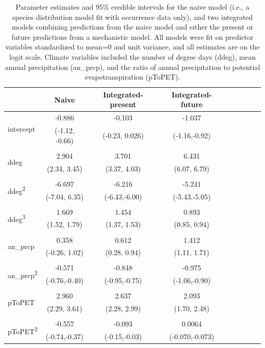\documentclass[11pt]{article}
\newcommand{\rev}[1]{{\color{RoyalBlue}#1}}
\begin{document}
\begin{table}[t]
	\footnotesize
	\caption{\rev{Parameter estimates and 95\% credible intervals for the naive model (i.e., a species distribution model fit with occurrence data only), and two integrated models combining predictions from the naive model and either the present or future predictions from a mechanistic model. All models were fit on predictor variables standardized to mean=0 and unit variance, and all estimates are on the logit scale. Climate variables included the number of degree days (ddeg), mean annual precipitation (an\_prcp), and the ratio of annual precipitation to potential evapotranspiration (pToPET).}}
	\begin{tabular}{lcccccccc}
	\toprule
	& Naive & Integrated-present & Integrated-future \\
	\midrule
	\multirow{2}{*}{intercept} & -0.886 & -0.103 & -1.037 \\
	& (-1.12, -0.66) & (-0.23, 0.026) & (-1.16,-0.92) \\
	& & & \\
	
	\multirow{2}{*}{ddeg} & 2.904 & 3.701 & 6.431 \\
	& (2.34, 3.45) & (3.37, 4.03) & (6.07, 6.79) \\
	& & & \\
	
	\multirow{2}{*}{ddeg\textsuperscript{2}} & -6.697 & -6.216 & -5.241 \\
	& (-7.04, 6.35) & (-6.43,-6.00) & (-5.43,-5.05) \\
	& & & \\
	
	\multirow{2}{*}{ddeg\textsuperscript{3}} & 1.669 & 1.454 & 0.893 \\
	& (1.52, 1.79) & (1.37, 1.53) & (0.85, 0.94) \\
	& & & \\
	
	\multirow{2}{*}{an\_prcp} & 0.358 & 0.612 & 1.412 \\
	& (-0.26, 1.02) & (0.28, 0.94) & (1.11, 1.71) \\
	& & & \\
	
	\multirow{2}{*}{an\_prcp\textsuperscript{2}} & -0.571 & -0.848 & -0.975 \\
	& (-0.76,-0.40) & (-0.95,-0.75) & (-1.06,-0.90) \\
	& & & \\
	
	\multirow{2}{*}{pToPET} & 2.960 & 2.637 & 2.093 \\
	& (2.29, 3.61) & (2.28, 2.99) & (1.70, 2.48) \\
	& & & \\
	
	\multirow{2}{*}{pToPET\textsuperscript{2}} & -0.557 & -0.093 & 0.0064 \\
	& (-0.74,-0.37) & (-0.15,-0.03) & (-0.070,-0.073) \\
	\bottomrule
	\end{tabular}
	\label{tab:ex2_params}
\end{table}
\end{document}
